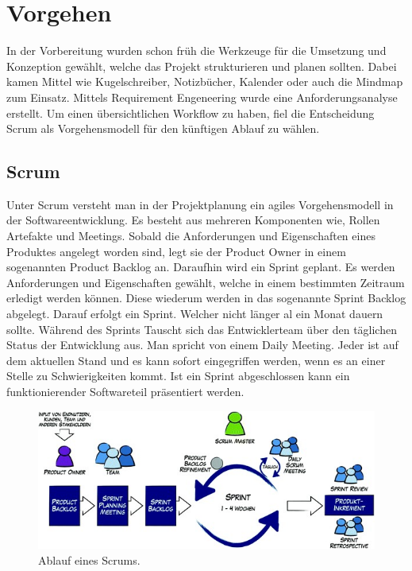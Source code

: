\chapter{Vorgehen}
In der Vorbereitung wurden schon früh die Werkzeuge für die Umsetzung und Konzeption gewählt, welche das Projekt strukturieren und planen sollten. Dabei kamen Mittel wie Kugelschreiber, Notizbücher, Kalender oder auch die Mindmap zum Einsatz. Mittels Requirement Engeneering wurde eine Anforderungsanalyse erstellt. Um einen übersichtlichen Workflow zu haben, fiel die Entscheidung Scrum als Vorgehensmodell für den künftigen Ablauf zu wählen.





\section{Scrum}
\label{scrum}

Unter Scrum versteht man in der Projektplanung ein agiles Vorgehensmodell in der Softwareentwicklung. Es besteht aus mehreren Komponenten wie, Rollen Artefakte und Meetings. Sobald die Anforderungen und Eigenschaften eines Produktes angelegt worden sind, legt sie der Product Owner in einem sogenannten Product Backlog an. Daraufhin wird ein Sprint geplant. Es werden Anforderungen und Eigenschaften gewählt, welche in einem bestimmten Zeitraum erledigt werden können. Diese wiederum werden in das sogenannte Sprint Backlog abgelegt. Darauf erfolgt ein Sprint. Welcher nicht länger al ein Monat dauern sollte. Während des Sprints Tauscht sich das Entwicklerteam über den täglichen Status der Entwicklung aus. Man spricht von einem Daily Meeting. Jeder ist auf dem aktuellen Stand und es kann sofort eingegriffen werden, wenn es an einer Stelle zu Schwierigkeiten kommt. Ist ein Sprint abgeschlossen kann ein funktionierender Softwareteil präsentiert werden. \autocite{Niermann.2017}

\begin{figure}[bh]
	\centering
	\includegraphics[scale=0.95]{content/pictures/scrum.jpg}
	\caption{Ablauf eines Scrums. \cite{Niermann.2017}}
	\label{fig:scrum}
\end{figure}


